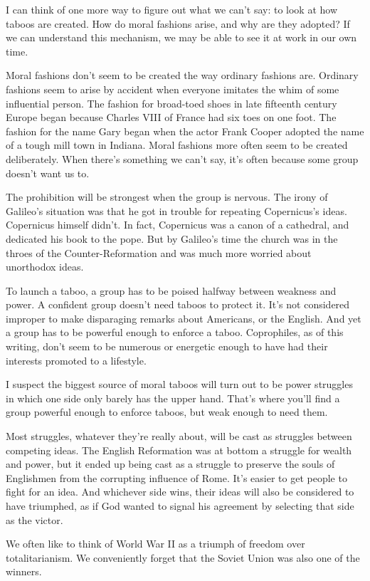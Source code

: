 I can think of one more way to figure out what we can't say: to look at
how taboos are created. How do moral fashions arise, and why are they
adopted? If we can understand this mechanism, we may be able to see it
at work in our own time.

Moral fashions don't seem to be created the way ordinary fashions are.
Ordinary fashions seem to arise by accident when everyone imitates the
whim of some influential person. The fashion for broad-toed shoes in
late fifteenth century Europe began because Charles VIII of France had
six toes on one foot. The fashion for the name Gary began when the actor
Frank Cooper adopted the name of a tough mill town in Indiana. Moral
fashions more often seem to be created deliberately. When there's
something we can't say, it's often because some group doesn't want us
to.

The prohibition will be strongest when the group is nervous. The irony
of Galileo's situation was that he got in trouble for repeating
Copernicus's ideas. Copernicus himself didn't. In fact, Copernicus was a
canon of a cathedral, and dedicated his book to the pope. But by
Galileo's time the church was in the throes of the Counter-Reformation
and was much more worried about unorthodox ideas.

To launch a taboo, a group has to be poised halfway between weakness and
power. A confident group doesn't need taboos to protect it. It's not
considered improper to make disparaging remarks about Americans, or the
English. And yet a group has to be powerful enough to enforce a taboo.
Coprophiles, as of this writing, don't seem to be numerous or energetic
enough to have had their interests promoted to a lifestyle.

I suspect the biggest source of moral taboos will turn out to be power
struggles in which one side only barely has the upper hand. That's where
you'll find a group powerful enough to enforce taboos, but weak enough
to need them.

Most struggles, whatever they're really about, will be cast as struggles
between competing ideas. The English Reformation was at bottom a
struggle for wealth and power, but it ended up being cast as a struggle
to preserve the souls of Englishmen from the corrupting influence of
Rome. It's easier to get people to fight for an idea. And whichever side
wins, their ideas will also be considered to have triumphed, as if God
wanted to signal his agreement by selecting that side as the victor.

We often like to think of World War II as a triumph of freedom over
totalitarianism. We conveniently forget that the Soviet Union was also
one of the winners.

